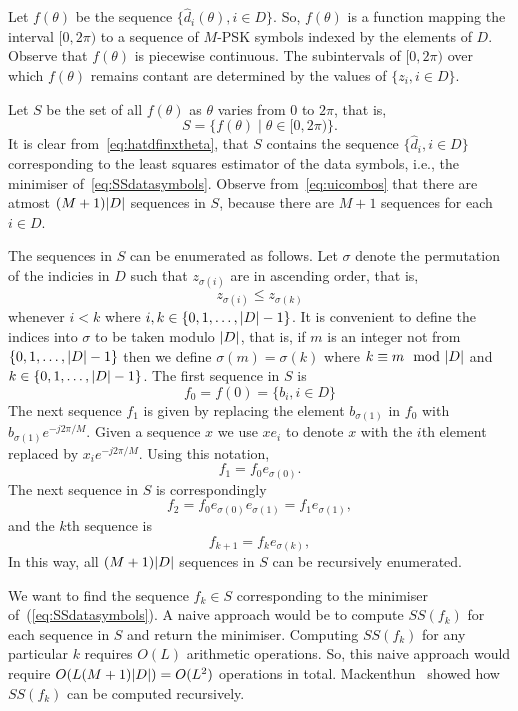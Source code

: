\documentclass[a4paper,10pt]{article}
\begin{document}
Let $f(\theta)$ be the sequence $\{ \hat{d}_i(\theta), i \in D \}$. So, $f(\theta)$ is a function mapping the interval $[0, 2\pi)$ to a sequence of $M$-PSK symbols indexed by the elements of $D$.  Observe that $f(\theta)$ is piecewise continuous.  The subintervals of $[0, 2\pi)$ over which $f(\theta)$ remains contant are determined by the values of $\{z_i, i \in D\}$.

Let $S$ be the set of all $f(\theta)$ as $\theta$ varies from $0$ to $2\pi$, that is,
\[
S = \{ f(\theta) \mid \theta \in [0, 2 \pi) \}.
\]
It is clear from~\eqref{eq:hatdfinxtheta}, that $S$ contains the sequence $\{ \hat{d}_i, i \in D \}$ corresponding to the least squares estimator of the data symbols, i.e., the minimiser of~\eqref{eq:SSdatasymbols}.  Observe from~\eqref{eq:uicombos} that there are atmost $(M+1){\left| D \right|}$ sequences in $S$, because there are $M+1$ sequences for each $i \in D$.

The sequences in $S$ can be enumerated as follows.  Let $\sigma$ denote the permutation of the indicies in $D$ such that $z_{\sigma(i)}$ are in ascending order, that is,
\begin{equation}\label{eq:sigmasortind}
z_{\sigma(i)} \leq z_{\sigma(k)}
\end{equation}
whenever $i < k $ where $i, k \in \{0, 1, \dots, {\left| D \right|}-1\}$.  It is convenient to define the indices into $\sigma$ to be taken modulo ${\left| D \right|}$, that is, if $m$ is an integer not from $\{0, 1, \dots, {\left| D \right|}-1\}$ then we define $\sigma(m) = \sigma(k)$ where $k \equiv m \mod \abs{D}$ and $k \in  \{0, 1, \dots, {\left| D \right|}-1\}$.  The first sequence in $S$ is 
\[
f_0 = f(0) = \{ b_i, i \in D \}
\]  
The next sequence $f_1$ is given by replacing the element $b_{\sigma(1)}$ in $f_0$ with $b_{\sigma(1)}e^{-j2\pi/M}$.  Given a sequence $x$ we use $x e_i$ to denote $x$ with the $i$th element replaced by $x_i e^{-j2\pi/M}$.  Using this notation,  
\[
f_1 = f_0 e_{\sigma(0)}.
\] 
The next sequence in $S$ is correspondingly 
\[
f_2 = f_0 e_{\sigma(0)} e_{\sigma(1)} = f_1 e_{\sigma(1)},
\]
and the $k$th sequence is
\begin{equation}\label{eq:fkrec}
f_{k+1} = f_{k} e_{\sigma(k)},
\end{equation}
In this way, all $(M+1){\left| D \right|}$ sequences in $S$ can be recursively enumerated.

We want to find the sequence $f_k \in S$ corresponding to the minimiser of~(\ref{eq:SSdatasymbols}).  A naive approach would be to compute $SS(f_k)$ for each sequence in $S$ and return the minimiser.  Computing $SS(f_k)$ for any particular $k$ requires $O(L)$ arithmetic operations.  So, this naive approach would require $O(L (M+1) {\left| D \right|}) = O(L^2)$ operations in total.  Mackenthun~\cite{Mackenthun1994} showed how $SS(f_k)$ can be computed recursively.
\end{document}
